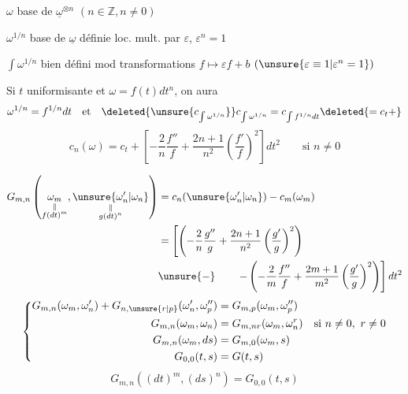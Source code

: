 $\omega$ base de $\underline\omega^{\otimes n}$ $(n\in\mathbb Z,n\ne0)$

$\omega^{1/n}$ base de $\underline\omega$ définie loc.  mult.
par $\varepsilon$, $\varepsilon^n=1$

$\int\omega^{1/n}$ bien défini mod transformations
$f\longmapsto\varepsilon f+b$ $(\unsure{\varepsilon\equiv1|\varepsilon^n=1})$

Si $t$ uniformisante et $\omega=f(t)dt^n$, on aura
\[
\omega^{1/n}=f^{1/n}dt\quad\text{et}\quad
\deleted{\unsure{c_{\int\omega^{1/n}}}}
c_{\int\omega^{1/n}}=c_{\int f^{1/n}dt}\deleted{=c_t+}
\]
\[
c_n(\omega)=c_t+\left[-\frac2n\frac{f''}{f}
+\frac{2n+1}{n^2}\left(\frac{f'}f\right)^2\right]dt^2
\qquad\text{si }n\ne0
\]

\[
\begin{aligned}
G_{m,n}\left(
\underset{\substack{\Vert\\f(dt)^m}}{\omega_m},
\underset{\substack{\Vert\\g(dt)^n}}{\unsure{\omega'_n|\omega_n}}\right)
&=c_n(\unsure{\omega'_n|\omega_n})-c_m(\omega_m)\\
&=\left[\left(-\frac2n\frac{g''}{g}
+\frac{2n+1}{n^2}\left(\frac{g'}g\right)^2\right)\right.\\
&\unsure{-}\qquad\left.-\left(-\frac2m\frac{f''}f
+\frac{2m+1}{m^2}\left(\frac{g'}g\right)^2\right)\right]dt^2
\end{aligned}
\]
\[
\left\{\begin{aligned}
G_{m,n}(\omega_m,\omega'_n)+G_{n,\unsure{r|p}}(\omega'_n,\omega''_p)
&=G_{m,p}(\omega_m,\omega''_p)\\
G_{m,n}(\omega_m,\omega_n)&=G_{m,nr}(\omega_m,\omega_n^r)
\quad\text{si }n\ne0,\ r\ne0\\
G_{m,n}(\omega_m,ds)&=G_{m,0}(\omega_m,s)\\
G_{0,0}(t,s)&=G(t,s)
\end{aligned}\right.
\]
\inserted{\[
G_{m,n}(\omega_m,(ds)^n)=G_{m,0}(\omega_m,s)
\]}
\[
G_{m,n}((dt)^m,(ds)^n)=G_{0,0}(t,s)
\]


